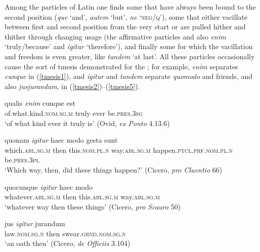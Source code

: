 Among the particles of Latin one finds some that have always been bound to the second position (\emph{que} `and', \emph{autem} `but', \emph{ne} `\textsc{neg/q}'), some that either vacillate between first and second position from the very start or are pulled hither and thither through changing usage (the affirmative particles and also \emph{enim} `truly{\slash}because' and \emph{igitur} `therefore'), and finally some for which the vacillation and freedom is even greater, like \emph{tandem} `at last'. All these particles occasionally cause the sort of tmesis demonstrated for the ; for example, \emph{enim} separates \emph{cunque} in (\ref{tmesis1}), and \emph{igitur} and \emph{tandem} separate \emph{quomodo} and friends, and also \emph{jusjurandum}, in (\ref{tmesis2})--(\ref{tmesis5}).

\begin{exe}
\ex
\gll qualis \emph{enim} cunque est\\
of.what.kind.\textsc{nom.sg.m} truly ever be.\textsc{pres.3sg}\\
\trans `of what kind ever it truly is' (Ovid, \textit{ex Ponto} 4.13.6)
\label{tmesis1}
\end{exe}

\begin{exe}
\ex
\gll quonam \emph{igitur} haec modo gesta sunt\\
which.\textsc{abl.sg.m} then this.\textsc{nom.pl.n} way.\textsc{abl.sg.m} happen.\textsc{ptcl.prf.nom.pl.n} be.\textsc{pres.3pl}\\ 
\trans `Which way, then, did these things happen?' (Cicero, \textit{pro Cluentio} 66)
\label{tmesis2}
\end{exe}

\begin{exe}
\ex
\gll quocunque \emph{igitur} haec modo\\
whatever.\textsc{abl.sg.m} then this.\textsc{abl.sg.m} way.\textsc{abl.sg.m}\\ 
\trans `whatever way then these things' (Cicero, \textit{pro Scauro} 50)
\label{tmesis3}
\end{exe}

\begin{exe}
\ex
\gll jus \emph{igitur} jurandum\\
law.\textsc{nom.sg.n} then swear.\textsc{grnd.nom.sg.n}\\ 
\trans `an oath then' (Cicero, \textit{de Officiis} 3.104) 
\label{tmesis4}
\end{exe}


